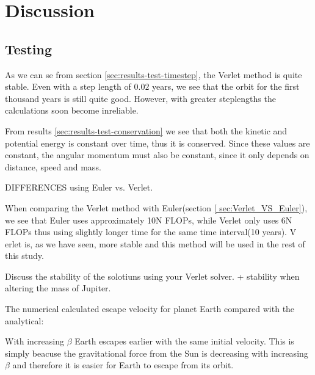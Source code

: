 \documentclass[../main.tex]{subfiles}
\begin{document}
\section{Discussion}\label{results}

\subsection{Testing}
As we can se from section \ref{sec:results-test-timestep}, the Verlet method is quite stable. Even with a step length of $0.02$ years, we see that the orbit for the first thousand years is still quite good. However, with greater steplengths the calculations soon become inreliable.

From results \ref{sec:results-test-conservation} we see that both the kinetic and potential energy is constant over time, thus it is conserved. Since these values are constant, the angular momentum must also be constant, since it only depends on distance, speed and mass.

DIFFERENCES using Euler vs. Verlet.

When comparing the Verlet method with Euler(section \ref{ sec:Verlet_VS_Euler}), we see that Euler uses approximately 10N FLOPs, while Verlet only uses 6N FLOPs thus using slightly longer time for the same time interval(10 years).
V
erlet is, as we have seen, more stable and this method will be used in the rest of this study.

Discuss the stability of the solotiuns using your Verlet solver.  + stability when altering the mass of Jupiter.

The numerical calculated escape velocity for planet Earth compared with the analytical:

With increasing $\beta$ Earth escapes earlier with the same initial velocity. This is simply beacuse the gravitational force from the Sun is decreasing with increasing $\beta$ and therefore it is easier for Earth to escape from its orbit.
\end{document}
